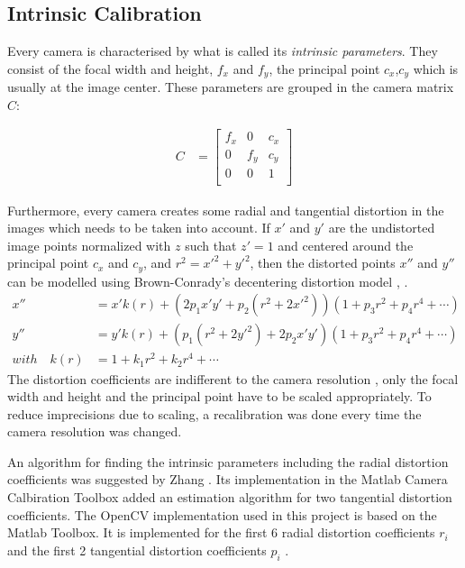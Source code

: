 
\subsection{Intrinsic Calibration}
\label{sec:intrinsic}

Every camera is characterised by what is called its \textit{intrinsic parameters}. They consist of the focal width and height, $f_x$ and $f_y$, the principal point $c_x$,$c_y$ which is usually at the image center. These parameters are grouped in the camera matrix $C$:

\begin{align}
    C &= \begin{bmatrix}
        f_x & 0 & c_x \\
        0 & f_y & c_y \\
        0 & 0 & 1 \\
    \end{bmatrix} 
\end{align}

Furthermore, every camera creates some radial and tangential distortion in the images which needs to be taken into account. 
If $x'$ and $y'$ are the undistorted image points normalized with $z$ such that $z'=1$ and centered around the principal point $c_x$ and $c_y$, and $r^2=x'^2+y'^2$,
then the distorted points $x''$ and $y''$ can be modelled using Brown-Conrady's decentering distortion model \cite{Brown1966}, \cite{Conrady1919}. 
\begin{align}
    x'' &= x' k(r) + (2p_1 x' y' + p_2(r^2 + 2x'^2))(1+p_3r^2+p_4r^4 + \cdots) \\
    y'' &= y' k(r) + (p_1(r^2+2y'^2) + 2p_2x'y')(1+p_3r^2+p_4r^4 + \cdots) \\
    with \quad k(r) &= 1+k_1r^2+k_2r^4 + \cdots
\end{align}
The distortion coefficients are indifferent to the camera resolution \cite{calib3d}, only the focal width and height and the principal point have to be scaled appropriately. To reduce imprecisions due to scaling, a recalibration was done every time the camera resolution was changed.

An algorithm for finding the intrinsic parameters including the radial distortion coefficients was suggested by Zhang \cite{Zhang2000}. 
Its implementation in the Matlab Camera Calbiration Toolbox added an estimation algorithm for two tangential distortion coefficients. \cite{MTB}
The OpenCV implementation used in this project is based on the Matlab Toolbox. It is implemented for the first 6 radial distortion coefficients $r_i$ and the first 2 tangential distortion coefficients $p_i$ \cite{calib3d}.

